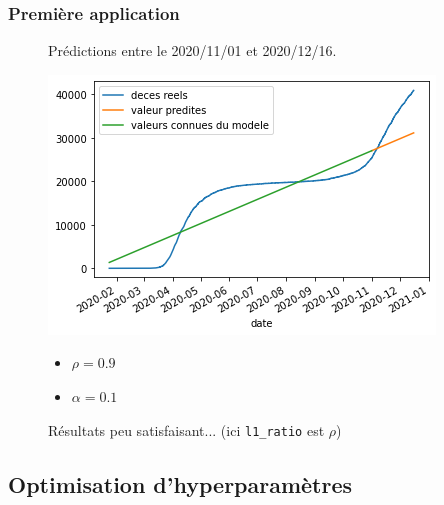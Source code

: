 \documentclass{beamer}[aspectratio = 43]
\begin{document}
\begin{frame}
	\frametitle{Première application}
	\begin{figure}
		Prédictions entre le 2020/11/01 et 2020/12/16.
		\begin{minipage}{0.8\textwidth}
					\includegraphics[scale=0.6]{EN_2020-11-01}
		\end{minipage}%
		\begin{minipage}{0.2\textwidth}
			\begin{itemize}
			\item[] $\rho = 0.9$
			\item[] $\alpha = 0.1$
			\end{itemize}
		\end{minipage}
		\caption{Résultats peu satisfaisant... (ici \texttt{l1\_ratio} est $\rho$)}
	\end{figure}
\end{frame}

\subsection{Optimisation d'hyperparamètres}
\end{document}
